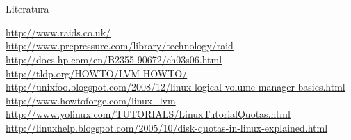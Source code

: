 \documentclass[croatian,t]{beamer} %
\begin{document}
	\section{}
	\begin{frame}{Literatura}
		\begin{tiny}
			\url{http://www.raids.co.uk/} \\
			\url{http://www.prepressure.com/library/technology/raid} \\
			\url{http://docs.hp.com/en/B2355-90672/ch03s06.html} \\
			\url{http://tldp.org/HOWTO/LVM-HOWTO/} \\
			\url{http://unixfoo.blogspot.com/2008/12/linux-logical-volume-manager-basics.html} \\
			\url{http://www.howtoforge.com/linux_lvm} \\
			\url{http://www.yolinux.com/TUTORIALS/LinuxTutorialQuotas.html} \\
			\url{http://linuxhelp.blogspot.com/2005/10/disk-quotas-in-linux-explained.html} \\
		\end{tiny}
	\end{frame}
\end{document}
